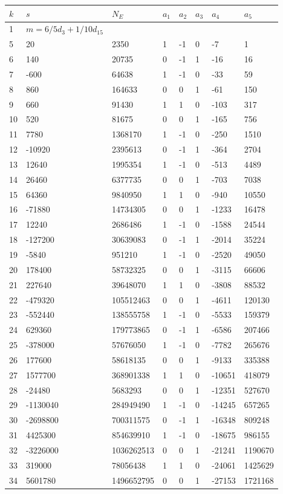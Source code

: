 \documentclass{amsart}
\begin{document}
\begin{longtable}{|l|l|l|lllll|}
\hline
$k$ & $s$ & $N_E$ & $a_1$ & $a_2$ & $a_3$ & $a_4$ & $a_5$\\
\hline
1&$m=6/5d_{3}+1/10d_{15}$&&\multicolumn{5}{c|}{}\\
5&20&2350&1&-1&0&-7&1\\
6&140&20735&0&-1&1&-16&16\\
7&-600&64638&1&-1&0&-33&59\\
8&860&164633&0&0&1&-61&150\\
9&660&91430&1&1&0&-103&317\\
10&520&81675&0&0&1&-165&756\\
11&7780&1368170&1&-1&0&-250&1510\\
12&-10920&2395613&0&-1&1&-364&2704\\
13&12640&1995354&1&-1&0&-513&4489\\
14&26460&6377735&0&0&1&-703&7038\\
15&64360&9840950&1&1&0&-940&10550\\
16&-71880&14734305&0&0&1&-1233&16478\\
17&12240&2686486&1&-1&0&-1588&24544\\
18&-127200&30639083&0&-1&1&-2014&35224\\
19&-5840&951210&1&-1&0&-2520&49050\\
20&178400&58732325&0&0&1&-3115&66606\\
21&227640&39648070&1&1&0&-3808&88532\\
22&-479320&105512463&0&0&1&-4611&120130\\
23&-552440&138555758&1&-1&0&-5533&159379\\
24&629360&179773865&0&-1&1&-6586&207466\\
25&-378000&57676050&1&-1&0&-7782&265676\\
26&177600&58618135&0&0&1&-9133&335388\\
27&1577700&368901338&1&1&0&-10651&418079\\
28&-24480&5683293&0&0&1&-12351&527670\\
29&-1130040&284949490&1&-1&0&-14245&657265\\
30&-2698800&700311575&0&-1&1&-16348&809248\\
31&4425300&854639910&1&-1&0&-18675&986155\\
32&-3226000&1036262513&0&0&1&-21241&1190670\\
33&319000&78056438&1&1&0&-24061&1425629\\
34&5601780&1496652795&0&0&1&-27153&1721168\\

\end{longtable}
\end{document}
